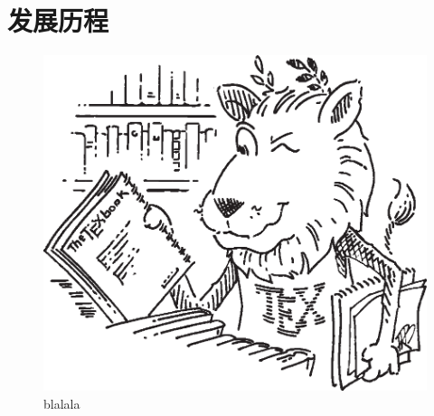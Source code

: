 \documentclass[../main]{subfiles}
\begin{document}
\chapter{发展历程}
\zhlipsum[2]
\begin{figure}[htp]
  \centering
  \includegraphics[scale=0.6]{figs/fig01-01lion}
  \caption{blalala}
\end{figure}
\end{document}
